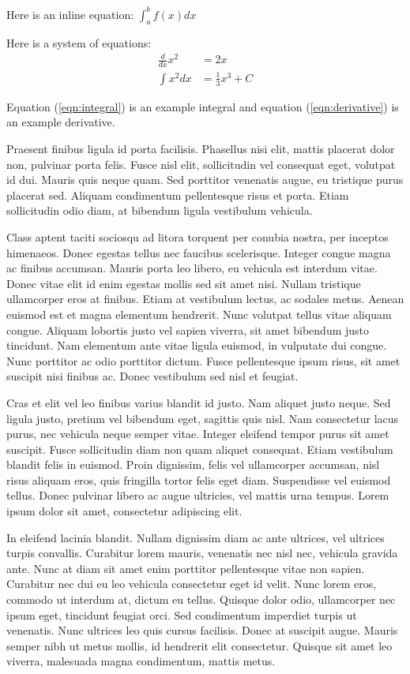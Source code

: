 \documentclass[12pt]{article}
\begin{document}
Here is an inline equation: $\int_a^b f(x) dx$

Here is a system of equations:
\begin{align}
    \label{eqn:derivative} \frac{d}{dx} x^2 &= 2x \\
    \label{eqn:integral} \int x^2 dx &= \frac{1}{3} x^3 + C
\end{align}

Equation (\ref{eqn:integral}) is an example integral and equation (\ref{eqn:derivative}) is an example derivative.

Praesent finibus ligula id porta facilisis. Phasellus nisi elit, mattis placerat dolor non, pulvinar porta felis. Fusce nisl elit, sollicitudin vel consequat eget, volutpat id dui. Mauris quis neque quam. Sed porttitor venenatis augue, eu tristique purus placerat sed. Aliquam condimentum pellentesque risus et porta. Etiam sollicitudin odio diam, at bibendum ligula vestibulum vehicula.

Class aptent taciti sociosqu ad litora torquent per conubia nostra, per inceptos himenaeos. Donec egestas tellus nec faucibus scelerisque. Integer congue magna ac finibus accumsan. Mauris porta leo libero, eu vehicula est interdum vitae. Donec vitae elit id enim egestas mollis sed sit amet nisi. Nullam tristique ullamcorper eros at finibus. Etiam at vestibulum lectus, ac sodales metus. Aenean euismod est et magna elementum hendrerit. Nunc volutpat tellus vitae aliquam congue. Aliquam lobortis justo vel sapien viverra, sit amet bibendum justo tincidunt. Nam elementum ante vitae ligula euismod, in vulputate dui congue. Nunc porttitor ac odio porttitor dictum. Fusce pellentesque ipsum risus, sit amet suscipit nisi finibus ac. Donec vestibulum sed nisl et feugiat.

Cras et elit vel leo finibus varius blandit id justo. Nam aliquet justo neque. Sed ligula justo, pretium vel bibendum eget, sagittis quis nisl. Nam consectetur lacus purus, nec vehicula neque semper vitae. Integer eleifend tempor purus sit amet suscipit. Fusce sollicitudin diam non quam aliquet consequat. Etiam vestibulum blandit felis in euismod. Proin dignissim, felis vel ullamcorper accumsan, nisl risus aliquam eros, quis fringilla tortor felis eget diam. Suspendisse vel euismod tellus. Donec pulvinar libero ac augue ultricies, vel mattis urna tempus. Lorem ipsum dolor sit amet, consectetur adipiscing elit.

In eleifend lacinia blandit. Nullam dignissim diam ac ante ultrices, vel ultrices turpis convallis. Curabitur lorem mauris, venenatis nec nisl nec, vehicula gravida ante. Nunc at diam sit amet enim porttitor pellentesque vitae non sapien. Curabitur nec dui eu leo vehicula consectetur eget id velit. Nunc lorem eros, commodo ut interdum at, dictum eu tellus. Quisque dolor odio, ullamcorper nec ipsum eget, tincidunt feugiat orci. Sed condimentum imperdiet turpis ut venenatis. Nunc ultrices leo quis cursus facilisis. Donec at suscipit augue. Mauris semper nibh ut metus mollis, id hendrerit elit consectetur. Quisque sit amet leo viverra, malesuada magna condimentum, mattis metus.
\end{document}
